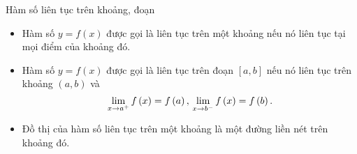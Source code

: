 \begin{dang}{Hàm số liên tục trên khoảng, đoạn}
	\begin{itemize}
		\item Hàm số $y=f(x)$ được gọi là liên tục trên một khoảng nếu nó liên tục tại mọi điểm của khoảng đó.\\
		\item Hàm số $y=f(x)$ được gọi là liên tục trên đoạn $[a,b]$ nếu nó liên tục trên khoảng $(a,b)$ và $$\mathop {\lim }\limits_{x \to {a^ + }} f\left( x \right) = f\left( a \right),{\rm{   }}\mathop {\lim }\limits_{x \to {b^ - }} f\left( x \right) = f\left( b \right).$$
		\item Đồ thị của hàm số liên tục trên một khoảng là một đường liền nét trên khoảng đó.
	\end{itemize}
\end{dang}
